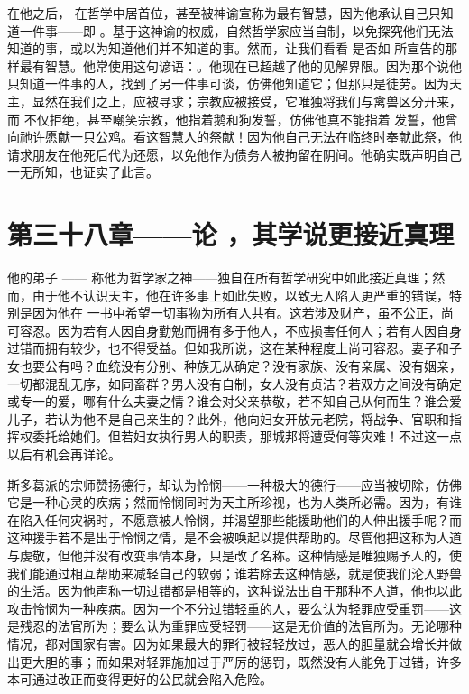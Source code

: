在他之后， 在哲学中居首位，甚至被神谕宣称为最有智慧，因为他承认自己只知道一件事——即 。基于这神谕的权威，自然哲学家应当自制，以免探究他们无法知道的事，或以为知道他们并不知道的事。然而，让我们看看  是否如  所宣告的那样最有智慧。他常使用这句谚语：。他现在已超越了他的见解界限。因为那个说他只知道一件事的人，找到了另一件事可谈，仿佛他知道它；但那只是徒劳。因为天主，显然在我们之上，应被寻求；宗教应被接受，它唯独将我们与禽兽区分开来，而  不仅拒绝，甚至嘲笑宗教，他指着鹅和狗发誓，仿佛他真不能指着  发誓，他曾向祂许愿献一只公鸡。看这智慧人的祭献！因为他自己无法在临终时奉献此祭，他请求朋友在他死后代为还愿，以免他作为债务人被拘留在阴间。他确实既声明自己一无所知，也证实了此言。\par


\section{第三十八章——论 ，其学说更接近真理}

他的弟子 —— 称他为哲学家之神——独自在所有哲学研究中如此接近真理；然而，由于他不认识天主，他在许多事上如此失败，以致无人陷入更严重的错误，特别是因为他在  一书中希望一切事物为所有人共有。这若涉及财产，虽不公正，尚可容忍。因为若有人因自身勤勉而拥有多于他人，不应损害任何人；若有人因自身过错而拥有较少，也不得受益。但如我所说，这在某种程度上尚可容忍。妻子和子女也要公有吗？血统没有分别、种族无从确定？没有家族、没有亲属、没有姻亲，一切都混乱无序，如同畜群？男人没有自制，女人没有贞洁？若双方之间没有确定或专一的爱，哪有什么夫妻之情？谁会对父亲恭敬，若不知自己从何而生？谁会爱儿子，若认为他不是自己亲生的？此外，他向妇女开放元老院，将战争、官职和指挥权委托给她们。但若妇女执行男人的职责，那城邦将遭受何等灾难！不过这一点以后有机会再详论。\par

斯多葛派的宗师赞扬德行，却认为怜悯——一种极大的德行——应当被切除，仿佛它是一种心灵的疾病；然而怜悯同时为天主所珍视，也为人类所必需。因为，有谁在陷入任何灾祸时，不愿意被人怜悯，并渴望那些能援助他们的人伸出援手呢？而这种援手若不是出于怜悯之情，是不会被唤起以提供帮助的。尽管他把这称为人道与虔敬，但他并没有改变事情本身，只是改了名称。这种情感是唯独赐予人的，使我们能通过相互帮助来减轻自己的软弱；谁若除去这种情感，就是使我们沦入野兽的生活。因为他声称一切过错都是相等的，这种说法出自于那种不人道，他也以此攻击怜悯为一种疾病。因为一个不分过错轻重的人，要么认为轻罪应受重罚——这是残忍的法官所为；要么认为重罪应受轻罚——这是无价值的法官所为。无论哪种情况，都对国家有害。因为如果最大的罪行被轻轻放过，恶人的胆量就会增长并做出更大胆的事；而如果对轻罪施加过于严厉的惩罚，既然没有人能免于过错，许多本可通过改正而变得更好的公民就会陷入危险。\par

